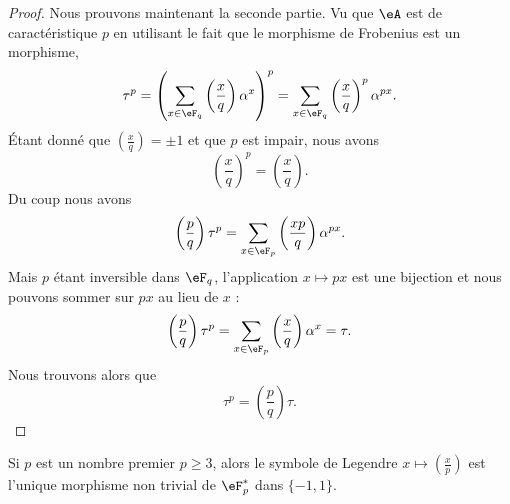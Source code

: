 \begin{proof}
    Nous prouvons maintenant la seconde partie. Vu que \( \eA\) est de caractéristique \( p\) en utilisant le fait que le morphisme de Frobenius est un morphisme,
    \begin{equation}
        \tau^p=\left( \sum_{x\in \eF_q}\left(\frac{x}{q}\right)\alpha^x \right)^p=\sum_{x\in \eF_q}\left(\frac{x}{q}\right)^p\alpha^{px}.
    \end{equation}
    Étant donné que \( \left(\frac{x}{q}\right)=\pm 1\) et que \( p\) est impair, nous avons
    \begin{equation}
        \left(\frac{x}{q}\right)^p=\left(\frac{x}{q}\right).
    \end{equation}
    Du coup nous avons
    \begin{equation}
        \left(\frac{p}{q}\right)\tau^p=\sum_{x\in \eF_p}\left(\frac{xp}{q}\right)\alpha^{px}.
    \end{equation}
    Mais \( p\) étant inversible dans \( \eF_q\), l'application \( x\mapsto px\) est une bijection et nous pouvons sommer sur \( px\) au lieu de \( x\) :
    \begin{equation}
        \left(\frac{p}{q}\right)\tau^p=\sum_{x\in \eF_p}\left(\frac{x}{q}\right)\alpha^x=\tau.
    \end{equation}
    Nous trouvons alors que
    \begin{equation}
        \tau^p=\left(\frac{p}{q}\right)\tau.
    \end{equation}
\end{proof}

\begin{lemma}\label{Lemoabzrn}
    Si \( p\) est un nombre premier \( p\geq 3\), alors le symbole de Legendre \( x\mapsto\left(\frac{x}{p}\right)\) est l'unique morphisme non trivial de \( \eF^*_p\) dans \( \{ -1,1 \}\).
\end{lemma}

